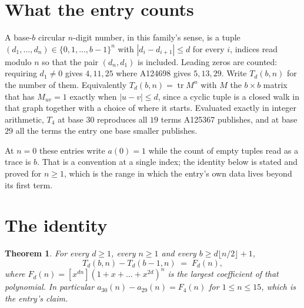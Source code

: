 \documentclass[11pt,a4paper]{article}
\theoremstyle{plain}
\newtheorem{theorem}{Theorem}
\theoremstyle{definition}
\begin{document}
\section{What the entry counts}

A base-$b$ circular $n$-digit number, in this family's sense, is a tuple
$(d_1,\dots,d_n)\in\{0,1,\dots,b-1\}^{n}$ with $|d_i-d_{i+1}|\le d$ for every $i$, indices
read modulo $n$ so that the pair $(d_n,d_1)$ is included. Leading zeros are counted: requiring
$d_1\ne0$ gives $4,11,25$ where A124698 gives $5,13,29$. Write $T_d(b,n)$ for the number of
them. Equivalently $T_d(b,n)=\operatorname{tr}M^{n}$ with $M$ the $b\times b$ matrix that has
$M_{uv}=1$ exactly when $|u-v|\le d$, since a cyclic tuple is a closed walk in that graph
together with a choice of where it starts. Evaluated exactly in integer arithmetic, $T_{4}$
at base $30$ reproduces all $19$ terms A125367 publishes, and at base $29$ all the
terms the entry one base smaller publishes.

At $n=0$ these entries write $a(0)=1$ while the count of empty tuples read as a trace is $b$.
That is a convention at a single index; the identity below is stated and proved for $n\ge1$,
which is the range in which the entry's own data lives beyond its first term.

\section{The identity}

\begin{theorem}
For every $d\ge1$, every $n\ge1$ and every $b\ge d\lfloor n/2\rfloor+1$,
\[
T_d(b,n)-T_d(b-1,n)\;=\;F_d(n),
\]
where $F_d(n)=[x^{dn}](1+x+\dots+x^{2d})^{n}$ is the largest coefficient of that
polynomial. In particular $a_{30}(n)-a_{29}(n)=F_{4}(n)$ for $1\le n\le15$, which
is the entry's claim.
\end{theorem}
\end{document}
